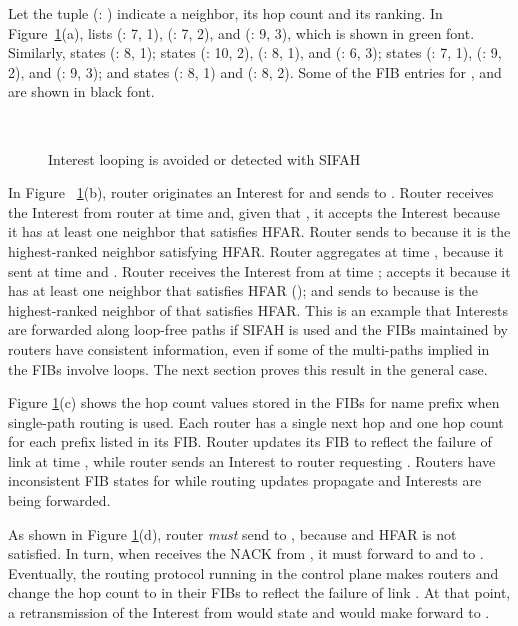 \documentclass{ancs15-alternate}
\begin{document}
Let the tuple  (: ) indicate a neighbor, its hop count and its ranking. In Figure~\ref{no-loop}(a),    lists (: 7, 1), (: 7, 2), and 
(: 9, 3), which  is  shown in green font. Similarly,   states (: 8, 1);
 states (: 10, 2), (: 8, 1), and  (: 6, 3);  states (: 7, 1), (: 9, 2), and (: 9, 3); and  states (: 8, 1) and (: 8, 2). 
Some of the FIB entries for ,  and  are shown in  black font.

\vspace{-0.1in}
\begin{figure}[h]
\begin{centering}
    \mbox{
      }
 \vspace{-0.1in}
   \caption{Interest looping is avoided or detected with SIFAH
   }
   \label{no-loop}
\end{centering} 
\end{figure}  

In Figure ~\ref{no-loop}(b),  router  originates an Interest for 
 and sends 
to . Router  receives the Interest from router  at time  and, 
given that  , 
it accepts the Interest because it has at least one neighbor
that satisfies HFAR. Router  sends   to  because 
it is the highest-ranked neighbor satisfying HFAR.  Router  aggregates   at time , because it sent   at time  and . 
Router  receives the Interest from  at time ;  
accepts it because it has at least one neighbor that satisfies HFAR
(); and sends  to  because   is the highest-ranked neighbor of  that satisfies HFAR.  
This is an example that Interests are forwarded along loop-free paths 
if SIFAH is used and the FIBs maintained by routers have consistent information, even if some of the multi-paths implied in the FIBs involve loops.
The next section proves this result in the general case.


Figure \ref{no-loop}(c) shows the hop count values stored in the FIBs for name prefix   when single-path routing is used. Each router has a single next hop and one hop count for each prefix listed in its FIB.  
Router  updates its FIB to reflect the failure of link   at time , while router  sends an Interest to router  requesting .
Routers have inconsistent FIB states for  while routing updates propagate and Interests are being forwarded.

As shown in Figure \ref{no-loop}(d), router  {\em must} send   to , 
because    and HFAR is not satisfied. In turn, when  receives the NACK from , it must forward   to  and to . Eventually, the routing protocol running in the control plane makes routers  and  change the hop count to  in their FIBs to reflect the failure of link . At that point, a retransmission of the Interest from  would state  and would make  forward   to .
\end{document}
